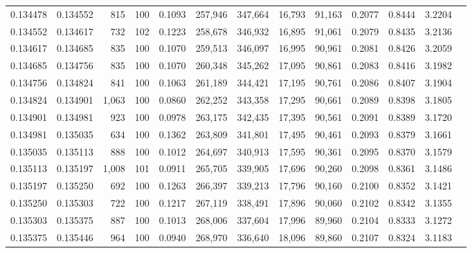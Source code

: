 \begin{tabular}{rrrrrrrrrrrrr}
0.134478 & 0.134552 &   815 & 100 &                                     0.1093 & 257,946 & 347,664 &  16,793 &  91,163 & 0.2077 & 0.8444 & 3.2204 \\
0.134552 & 0.134617 &   732 & 102 &                                     0.1223 & 258,678 & 346,932 &  16,895 &  91,061 & 0.2079 & 0.8435 & 3.2136 \\
0.134617 & 0.134685 &   835 & 100 &                                     0.1070 & 259,513 & 346,097 &  16,995 &  90,961 & 0.2081 & 0.8426 & 3.2059 \\
0.134685 & 0.134756 &   835 & 100 &                                     0.1070 & 260,348 & 345,262 &  17,095 &  90,861 & 0.2083 & 0.8416 & 3.1982 \\
0.134756 & 0.134824 &   841 & 100 &                                     0.1063 & 261,189 & 344,421 &  17,195 &  90,761 & 0.2086 & 0.8407 & 3.1904 \\
0.134824 & 0.134901 & 1,063 & 100 &                                     0.0860 & 262,252 & 343,358 &  17,295 &  90,661 & 0.2089 & 0.8398 & 3.1805 \\
0.134901 & 0.134981 &   923 & 100 &                                     0.0978 & 263,175 & 342,435 &  17,395 &  90,561 & 0.2091 & 0.8389 & 3.1720 \\
0.134981 & 0.135035 &   634 & 100 &                                     0.1362 & 263,809 & 341,801 &  17,495 &  90,461 & 0.2093 & 0.8379 & 3.1661 \\
0.135035 & 0.135113 &   888 & 100 &                                     0.1012 & 264,697 & 340,913 &  17,595 &  90,361 & 0.2095 & 0.8370 & 3.1579 \\
0.135113 & 0.135197 & 1,008 & 101 &                                     0.0911 & 265,705 & 339,905 &  17,696 &  90,260 & 0.2098 & 0.8361 & 3.1486 \\
0.135197 & 0.135250 &   692 & 100 &                                     0.1263 & 266,397 & 339,213 &  17,796 &  90,160 & 0.2100 & 0.8352 & 3.1421 \\
0.135250 & 0.135303 &   722 & 100 &                                     0.1217 & 267,119 & 338,491 &  17,896 &  90,060 & 0.2102 & 0.8342 & 3.1355 \\
0.135303 & 0.135375 &   887 & 100 &                                     0.1013 & 268,006 & 337,604 &  17,996 &  89,960 & 0.2104 & 0.8333 & 3.1272 \\
0.135375 & 0.135446 &   964 & 100 &                                     0.0940 & 268,970 & 336,640 &  18,096 &  89,860 & 0.2107 & 0.8324 & 3.1183 \\

\end{tabular}

